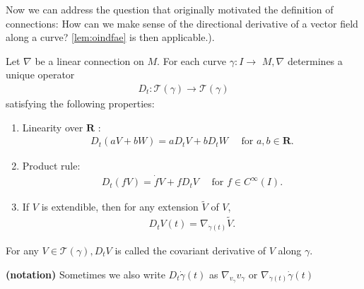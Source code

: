 \documentclass[12pt]{article} %
\newcommand{\bfs}[1]{\textbf{({#1}) }}
\begin{document}
Now we can address the question that originally motivated the definition of connections: How can we make sense of the directional derivative of a vector field along a curve?  \cref{lem:oindfae} is then applicable.).
\begin{lema}
Let $\nabla$ be a linear connection on $M$. For each curve $\gamma: I \rightarrow$ $M, \nabla$ determines a unique operator
\begin{align*}
D_{t}: \mathcal{T}(\gamma) \rightarrow \mathcal{T}(\gamma)
\end{align*}
satisfying the following properties:
\begin{enumerate}
    \item Linearity over $\mathbf{R}$ :
\begin{align*}
D_{t}(a V+b W)=a D_{t} V+b D_{t} W \quad \text { for } a, b \in \mathbf{R} .
\end{align*}
\item Product rule:
\begin{align*}
D_{t}(f V)=\dot{f} V+f D_{t} V \quad \text { for } f \in C^{\infty}(I) .
\end{align*}
\item If $V$ is extendible, then for any extension $\tilde{V}$ of $V$,
\begin{align*}
D_{t} V(t)=\nabla_{\dot{\gamma}(t)} \tilde{V} .
\end{align*}
\end{enumerate}
For any $V \in \mathcal{T}(\gamma), D_{t} V$ is called the covariant derivative of $V$ along $\gamma$.
\end{lema} 
\begin{rema}\bfs{notation}
 Sometimes  we also write $D_t\dot{\gamma}(t) $ as $ \nabla_{v_{\gamma}}v_{\gamma} $ or $ \nabla_{\dot{\gamma}(t)}\dot{\gamma}(t) $
\end{rema}
\end{document}
